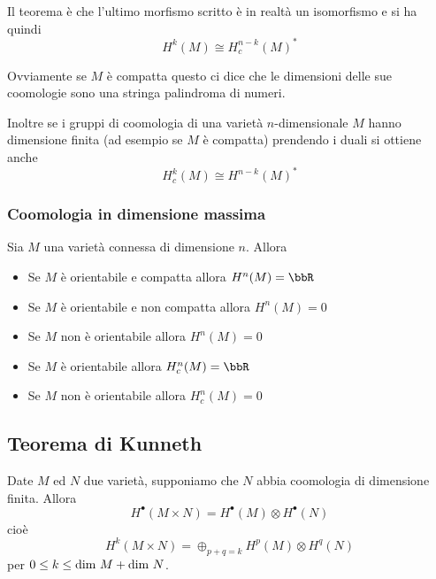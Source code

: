 \documentclass[a4paper,NoNotes,GeneralMath]{stdmdoc}
\begin{document}
Il teorema è che l'ultimo morfismo scritto è in realtà un isomorfismo e si ha quindi
$$ H^k(M) \cong H^{n-k}_c(M)^* $$

Ovviamente se $M$ è compatta questo ci dice che le dimensioni delle sue coomologie sono una stringa palindroma di numeri.

Inoltre se i gruppi di coomologia di una varietà $n$-dimensionale $M$ hanno dimensione finita (ad esempio se $M$ è compatta) prendendo i duali si ottiene anche
$$ H^k_c(M) \cong H^{n-k}(M)^* $$

\subsubsection{Coomologia in dimensione massima}
Sia $M$ una varietà connessa di dimensione $n$. Allora
\begin{itemize}
\item Se $M$ è orientabile e compatta allora $H^n(M) = \bbR$
\item Se $M$ è orientabile e non compatta allora $H^n(M) = 0$
\item Se $M$ non è orientabile allora $H^n(M) = 0$
\item Se $M$ è orientabile allora $H^n_c(M) = \bbR$
\item Se $M$ non è orientabile allora $H^n_c(M) = 0$
\end{itemize}

\subsection{Teorema di Kunneth}
Date $M$ ed $N$ due varietà, supponiamo che $N$ abbia coomologia di dimensione finita. Allora
$$ H^\bullet(M \times N) = H^\bullet(M) \otimes H^\bullet(N) $$
cioè
$$ H^k(M \times N) = \oplus_{p + q = k} H^p(M) \otimes H^q(N) $$
per $0 \le k \le \mbox{dim } M + \mbox{dim } N$.
\end{document}

